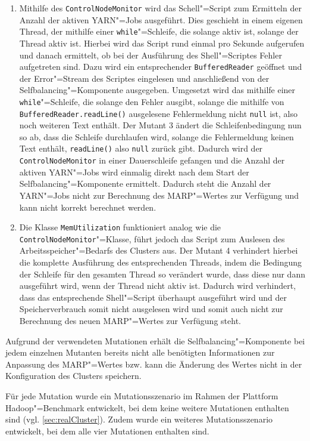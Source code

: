 \begin{enumerate}
    \item
    Mithilfe des \texttt{ControlNodeMonitor} wird das Schell"=Script zum Ermitteln der Anzahl der aktiven YARN"=Jobs ausgeführt.
    Dies geschieht in einem eigenen Thread, der mithilfe einer \texttt{while}"=Schleife, die solange aktiv ist, solange der Thread aktiv ist.
    Hierbei wird das Script rund einmal pro Sekunde aufgerufen und danach ermittelt, ob bei der Ausführung des Shell"=Scriptes Fehler aufgetreten sind.
    Dazu wird ein entsprechender \texttt{BufferedReader} geöffnet und der Error"=Stream des Scriptes eingelesen und anschließend von der Selfbalancing"=Komponente ausgegeben.
    Umgesetzt wird das mithilfe einer \texttt{while}"=Schleife, die solange den Fehler ausgibt, solange die mithilfe von \texttt{BufferedReader.readLine()} ausgelesene Fehlermeldung nicht \texttt{null} ist, also noch weiteren Text enthält.
    Der Mutant 3 ändert die Schleifenbedingung nun so ab, dass die Schleife durchlaufen wird, solange die Fehlermeldung keinen Text enthält, \texttt{readLine()} also \texttt{null} zurück gibt.
    Dadurch wird der \texttt{ControlNodeMonitor} in einer Dauerschleife gefangen und die Anzahl der aktiven YARN"=Jobs wird einmalig direkt nach dem Start der Selfbalancing"=Komponente ermittelt.
    Dadurch steht die Anzahl der YARN"=Jobs nicht zur Berechnung des \gls{MARP}"=Wertes zur Verfügung und kann nicht korrekt berechnet werden.
            
    \item
    Die Klasse \texttt{MemUtilization} funktioniert analog wie die \texttt{ControlNodeMonitor}"=Klasse, führt jedoch das Script zum Auslesen des Arbeitsspeicher"=Bedarfs des Clusters aus.
    Der Mutant 4 verhindert hierbei die komplette Ausführung des entsprechenden Threads, indem die Bedingung der Schleife für den gesamten Thread so verändert wurde, dass diese nur dann ausgeführt wird, wenn der Thread nicht aktiv ist.
    Dadurch wird verhindert, dass das entsprechende Shell"=Script überhaupt ausgeführt wird und der Speicherverbrauch somit nicht ausgelesen wird und somit auch nicht zur Berechnung des neuen \gls{MARP}"=Wertes zur Verfügung steht.
\end{enumerate}

Aufgrund der verwendeten Mutationen erhält die Selfbalancing"=Komponente bei jedem einzelnen Mutanten bereits nicht alle benötigten Informationen zur Anpassung des \gls{MARP}"=Wertes bzw. kann die Änderung des Wertes nicht in der Konfiguration des Clusters speichern.

Für jede Mutation wurde ein Mutationsszenario im Rahmen der Plattform Hadoop"=Benchmark entwickelt, bei dem keine weitere Mutationen enthalten sind (vgl. \cref{sec:realCluster}).
Zudem wurde ein weiteres Mutationsszenario entwickelt, bei dem alle vier Mutationen enthalten sind.
